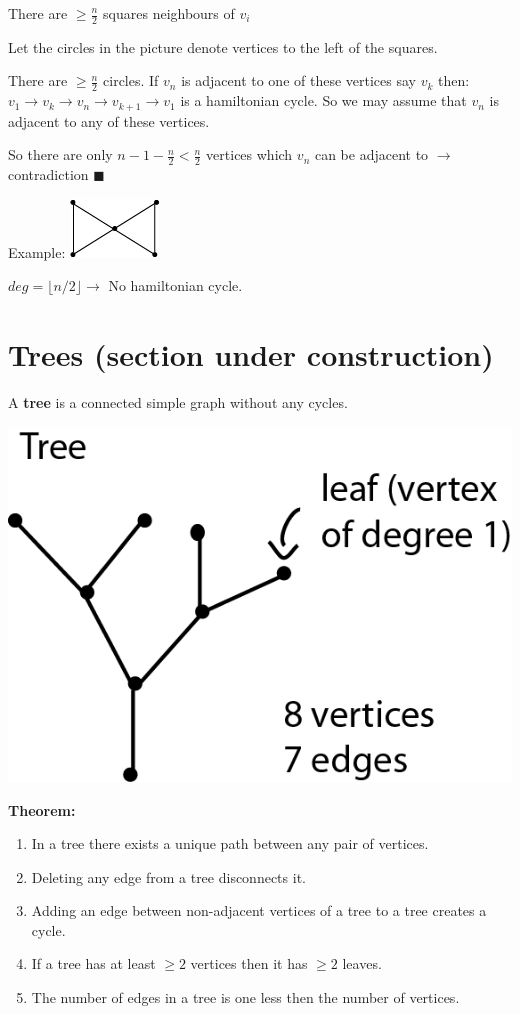 \documentclass[9pt, letterpaper, oneside]{article}
\begin{document}
There are $\geq \frac{n}{2}$ squares neighbours of $v_i$

Let the circles in the picture denote vertices to the left of the squares.

There are $\geq \frac{n}{2}$ circles. If $v_n$ is adjacent to one of these vertices say $v_k$ then: $v_1 \to v_k \to v_n \to v_{k+1} \to v_1$ is a hamiltonian cycle. So we may assume that $v_n$ is adjacent to any of these vertices.

So there are only $n - 1 - \frac{n}{2} < \frac{n}{2}$ vertices which $v_n$ can be adjacent to $\to$ contradiction $\blacksquare$

Example:
\includegraphics{fig16.png}

$deg = \lfloor n / 2 \rfloor \to$ No hamiltonian cycle. 

\section{Trees (section under construction)}
A \textbf{tree} is a connected simple graph without any cycles.

\includegraphics{fig17.png}

\textbf{Theorem:}
\begin{enumerate}
    \item In a tree there exists a unique path between any pair of vertices.
    \item Deleting any edge from a tree disconnects it.
    \item Adding an edge between non-adjacent vertices of a tree to a tree creates a cycle.
    \item If a tree has at least $\geq 2$ vertices then it has $\geq 2$ leaves.
    \item The number of edges in a tree is one less then the number of vertices.
\end{enumerate}
\end{document}
